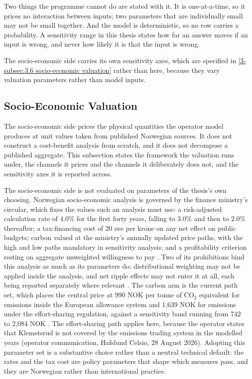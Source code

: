 Two things the programme cannot do are stated with it. It is one-at-a-time, so it prices no interaction between inputs; two parameters that are individually small may not be small together. And the model is deterministic, so no row carries a probability. A sensitivity range in this thesis states how far an answer moves if an input is wrong, and never how likely it is that the input is wrong.

The socio-economic side carries its own sensitivity axes, which are specified in \autoref{3-subsec:3.6 socio-economic valuation} rather than here, because they vary valuation parameters rather than model inputs.

\subsection{Socio-Economic Valuation}
\label{3-subsec:3.6 socio-economic valuation}

The socio-economic side prices the physical quantities the operator model produces at unit values taken from published Norwegian sources. It does not construct a cost-benefit analysis from scratch, and it does not decompose a published aggregate. This subsection states the framework the valuation runs under, the channels it prices and the channels it deliberately does not, and the sensitivity axes it is reported across.

The socio-economic side is not evaluated on parameters of the thesis's own choosing. Norwegian socio-economic analysis is governed by the finance ministry's circular, which fixes the values such an analysis must use: a risk-adjusted calculation rate of $4.0\%$ for the first forty years, falling to $3.0\%$ and then to $2.0\%$ thereafter; a tax-financing cost of 20 øre per krone on any net effect on public budgets; carbon valued at the ministry's annually updated price paths, with the high and low paths mandatory in sensitivity analysis; and a profitability criterion resting on aggregate unweighted willingness to pay \cite{finansdepartement_prinsipper_2021}. Two of its prohibitions bind this analysis as much as its parameters do: distributional weighting may not be applied inside the analysis, and net ripple effects may not enter it at all, each being reported separately where relevant \cite{finansdepartement_prinsipper_2021}. The carbon arm is the current path set, which places the central price at 990 NOK per tonne of CO$_2$ equivalent for emissions inside the European allowance system and 1,639 NOK for emissions under the effort-sharing regulation, against a sensitivity band running from 742 to 2,084 NOK \cite{finansdepartementet_karbonprisbaner_2025}. The effort-sharing path applies here, because the operator states that Klemetsrud is not covered by the emissions trading system in the modelled years (operator communication, Hafslund Celsio, 28 August 2026). Adopting this parameter set is a substantive choice rather than a neutral technical default: the rates and the tax cost are policy parameters that shape which measures pass, and they are Norwegian rather than international practice.

